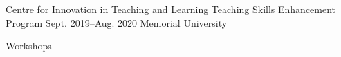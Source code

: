 \begin{cventries}
  \cventry
    {Centre for Innovation in Teaching and Learning} %
    {Teaching Skills Enhancement Program} %
    {Sept. 2019--Aug. 2020} %
    {Memorial University} %
    {
    }

\end{cventries}

Workshops

